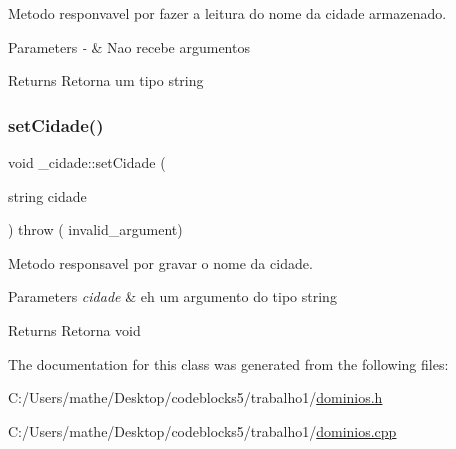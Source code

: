 Metodo responvavel por fazer a leitura do nome da cidade armazenado. 


\begin{DoxyParams}{Parameters}
{\em -\/} & Nao recebe argumentos \\
\hline
\end{DoxyParams}
\begin{DoxyReturn}{Returns}
Retorna um tipo string 
\end{DoxyReturn}
\mbox{\label{class__cidade_a162a0bfe2cf91357f92b665a5d496290}} 
\subsubsection{\texorpdfstring{setCidade()}{setCidade()}}
{\footnotesize\ttfamily void \+\_\+cidade\+::set\+Cidade (\begin{DoxyParamCaption}\item[{string}]{cidade }\end{DoxyParamCaption}) throw ( invalid\+\_\+argument) }



Metodo responsavel por gravar o nome da cidade. 


\begin{DoxyParams}{Parameters}
{\em cidade} & eh um argumento do tipo string \\
\hline
\end{DoxyParams}
\begin{DoxyReturn}{Returns}
Retorna void 
\end{DoxyReturn}


The documentation for this class was generated from the following files\+:\begin{DoxyCompactItemize}
\item 
C\+:/\+Users/mathe/\+Desktop/codeblocks5/trabalho1/\mbox{\hyperlink{dominios_8h}{dominios.\+h}}\item 
C\+:/\+Users/mathe/\+Desktop/codeblocks5/trabalho1/\mbox{\hyperlink{dominios_8cpp}{dominios.\+cpp}}\end{DoxyCompactItemize}

